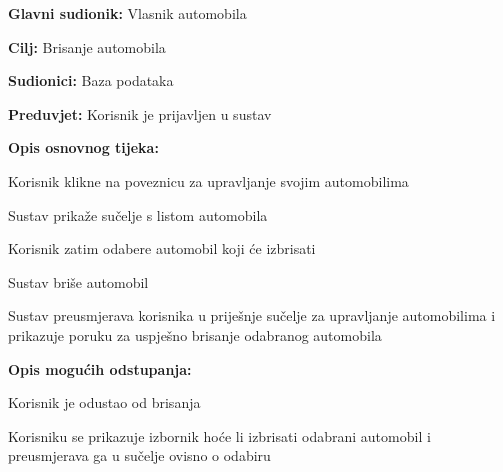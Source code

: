 					\noindent {}
					\begin{packed_item}
						
						\item \textbf{Glavni sudionik: } Vlasnik automobila
						\item  \textbf{Cilj:} Brisanje automobila
						\item  \textbf{Sudionici:} Baza podataka
						\item  \textbf{Preduvjet:} Korisnik je prijavljen u sustav
						\item  \textbf{Opis osnovnog tijeka:}
						
						\item[] \begin{packed_enum}
							
							\item Korisnik klikne na poveznicu za upravljanje svojim automobilima
							\item Sustav prikaže sučelje s listom automobila
							\item Korisnik zatim odabere automobil koji će izbrisati
							\item Sustav briše automobil
							\item Sustav preusmjerava korisnika u priješnje sučelje za upravljanje automobilima i prikazuje poruku za uspješno brisanje odabranog automobila
							
						\end{packed_enum}
						\item  \textbf{Opis mogućih odstupanja:}
						
						\item[] \begin{packed_item}
							
							\item[4.a] Korisnik je odustao od brisanja
							\item[] \begin{packed_enum}
								
								\item Korisniku se prikazuje izbornik hoće li izbrisati odabrani automobil i preusmjerava ga u sučelje ovisno o odabiru
								
							\end{packed_enum}
								
							\end{packed_item}
							
					\end{packed_item}
					

